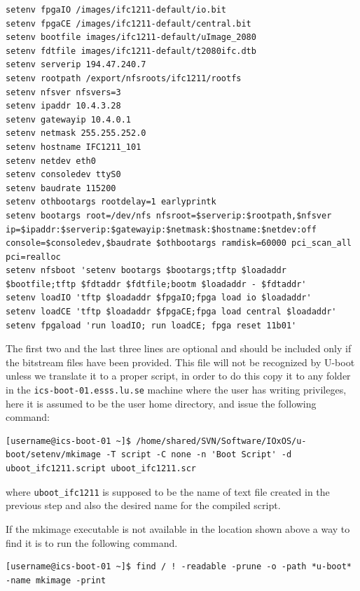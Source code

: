 \documentclass[11pt
  , a4paper
  , article
  , oneside
  , showtrims
]{memoir}
\begin{document}
\begin{lstlisting}[style=texteditor]
setenv fpgaIO /images/ifc1211-default/io.bit
setenv fpgaCE /images/ifc1211-default/central.bit
setenv bootfile images/ifc1211-default/uImage_2080
setenv fdtfile images/ifc1211-default/t2080ifc.dtb
setenv serverip 194.47.240.7
setenv rootpath /export/nfsroots/ifc1211/rootfs
setenv nfsver nfsvers=3
setenv ipaddr 10.4.3.28
setenv gatewayip 10.4.0.1
setenv netmask 255.255.252.0
setenv hostname IFC1211_101
setenv netdev eth0
setenv consoledev ttyS0
setenv baudrate 115200
setenv othbootargs rootdelay=1 earlyprintk
setenv bootargs root=/dev/nfs nfsroot=$serverip:$rootpath,$nfsver ip=$ipaddr:$serverip:$gatewayip:$netmask:$hostname:$netdev:off console=$consoledev,$baudrate $othbootargs ramdisk=60000 pci_scan_all pci=realloc
setenv nfsboot 'setenv bootargs $bootargs;tftp $loadaddr $bootfile;tftp $fdtaddr $fdtfile;bootm $loadaddr - $fdtaddr'
setenv loadIO 'tftp $loadaddr $fpgaIO;fpga load io $loadaddr'
setenv loadCE 'tftp $loadaddr $fpgaCE;fpga load central $loadaddr'
setenv fpgaload 'run loadIO; run loadCE; fpga reset 11b01'
\end{lstlisting}

The first two and the last three lines are optional and should be included only if the bitstream files have been provided.
This file will not be recognized by U-boot unless we translate it to a proper script, in order to do this copy it to any folder in the \texttt{ics-boot-01.esss.lu.se} machine where the user has writing privileges, here it is assumed to be the user home directory, and issue the following command:

\begin{lstlisting}[style=termstyle]
[username@ics-boot-01 ~]$ /home/shared/SVN/Software/IOxOS/u-boot/setenv/mkimage -T script -C none -n 'Boot Script' -d uboot_ifc1211.script uboot_ifc1211.scr
\end{lstlisting}

where \texttt{uboot\_ifc1211} is supposed to be the name of text file created in the previous step and also the desired name for the compiled script.

If the mkimage executable is not available in the location shown above a way to find it is to run the following command.

\begin{lstlisting}[style=termstyle]
[username@ics-boot-01 ~]$ find / ! -readable -prune -o -path *u-boot* -name mkimage -print
\end{lstlisting}
\end{document}
